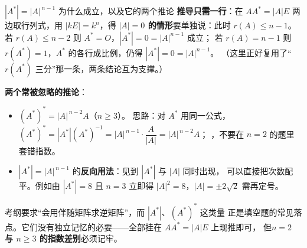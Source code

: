 \begin{fdeep}{$|A^{*}|=|A|^{\,n-1}$ 为什么成立，以及它的两个推论}
\textbf{推导只需一行}：在 $AA^{*}=|A|E$ 两边取行列式，用 $|kE|=k^{n}$，得
\textbf{$|A|=0$ 的情形}要单独说：此时 $r(A)\le n-1$。
若 $r(A)\le n-2$ 则 $A^{*}=O$，$|A^{*}|=0=|A|^{n-1}$ 成立；
若 $r(A)=n-1$ 则 $r(A^{*})=1$，$A^{*}$ 的各行成比例，仍得 $|A^{*}|=0=|A|^{n-1}$。
（这里正好复用了“$r(A^{*})$ 三分”那一条，两条结论互为支撑。）

\medskip
\textbf{两个常被忽略的推论}：
\begin{itemize}[leftmargin=2.2em,itemsep=0.22em]
\item $(A^{*})^{*}=|A|^{\,n-2}A$（$n\ge3$）。
      思路：对 $A^{*}$ 用同一公式，$(A^{*})^{*}=|A^{*}|(A^{*})^{-1}=|A|^{\,n-1}\cdot\dfrac{A}{|A|}=|A|^{\,n-2}A$；
      ，不要在 $n=2$ 的题里套错指数。
\item $|A^{*}|=|A|^{\,n-1}$ 的\textbf{反向用法}：见到 $|A^{*}|$ 与 $|A|$ 同时出现，
      可以直接把次数配平。例如由 $|A^{*}|=8$ 且 $n=3$ 立即得 $|A|^{2}=8$，$|A|=\pm2\sqrt2$ 需再定号。
\end{itemize}
\fbref{}考纲要求“会用伴随矩阵求逆矩阵”，而 $|A^{*}|$、$(A^{*})^{*}$ 这类量
正是填空题的常见落点。它们没有独立记忆的必要——全部挂在 $AA^{*}=|A|E$ 上现推即可，
但\textbf{$n=2$ 与 $n\ge3$ 的指数差别}必须记牢。
\end{fdeep}


